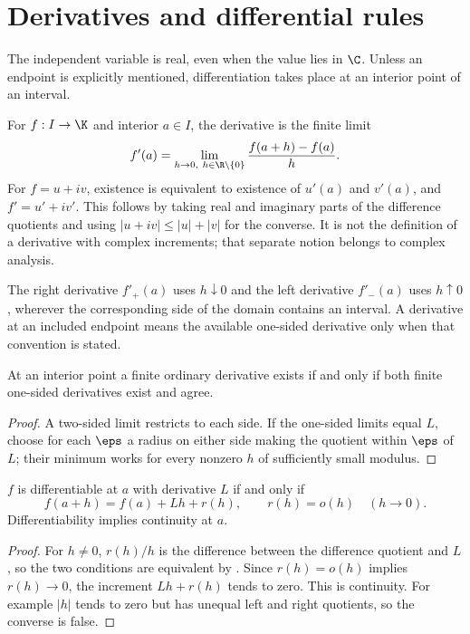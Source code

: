 \chapter{Derivatives and differential rules}
The independent variable is real, even when the value lies in $\C$. Unless an endpoint is explicitly mentioned, differentiation takes place at an interior point of an interval.

\begin{definition}
For $f:I\to\K$ and interior $a\in I$, the derivative is the finite limit
\[ f'(a)=\lim_{h\to0,\ h\in\R\setminus\{0\}}\frac{f(a+h)-f(a)}h. \]
For $f=u+iv$, existence is equivalent to existence of $u'(a)$ and $v'(a)$, and $f'=u'+iv'$. This follows by taking real and imaginary parts of the difference quotients and using $|u+iv|\le|u|+|v|$ for the converse. It is not the definition of a derivative with complex increments; that separate notion belongs to complex analysis.
\end{definition}

\begin{definition}
The right derivative $f'_+(a)$ uses $h\downarrow0$ and the left derivative $f'_-(a)$ uses $h\uparrow0$, wherever the corresponding side of the domain contains an interval. A derivative at an included endpoint means the available one-sided derivative only when that convention is stated.
\end{definition}
\begin{proposition}
At an interior point a finite ordinary derivative exists if and only if both finite one-sided derivatives exist and agree.
\end{proposition}
\begin{proof}
A two-sided limit restricts to each side. If the one-sided limits equal $L$, choose for each $\eps$ a radius on either side making the quotient within $\eps$ of $L$; their minimum works for every nonzero $h$ of sufficiently small modulus.
\end{proof}

\begin{theorem}
$f$ is differentiable at $a$ with derivative $L$ if and only if
\[ f(a+h)=f(a)+Lh+r(h),\qquad r(h)=o(h)\quad(h\to0). \]
Differentiability implies continuity at $a$.
\end{theorem}
\begin{proof}
For $h\ne0$, $r(h)/h$ is the difference between the difference quotient and $L$, so the two conditions are equivalent by . Since $r(h)=o(h)$ implies $r(h)\to0$, the increment $Lh+r(h)$ tends to zero. This is continuity. For example $|h|$ tends to zero but has unequal left and right quotients, so the converse is false.
\end{proof}

